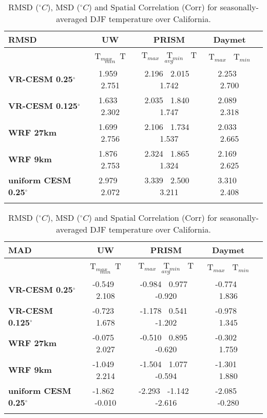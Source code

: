\documentclass[ms]{agutexSI}
\begin{document}
\begin{table}
\begin{center}
\caption{RMSD ($^\circ C$), MSD ($^\circ C$) and Spatial Correlation (Corr) for seasonally-averaged DJF temperature over California.} 
\begin{tabular}{lcccc}
\hline \textbf{RMSD} & \textbf{UW}  & \textbf{PRISM} & \textbf{Daymet} \\
\hline $    $ & T$_{max}$ $\     $  T$_{min}$ & T$_{max}$ $\     $  T$_{min}$ $\     $ T$_{avg}$& T$_{max}$ $\     $  T$_{min}$\\
\hline \textbf{VR-CESM 0.25$^\circ$} & 1.959 $\ $ 2.751 & 2.196 $\ $ 2.015 $\ $ 1.742 & 2.253 $\ $ 2.700 \\
\textbf{VR-CESM 0.125$^\circ$} & 1.633 $\ $ 2.302 & 2.035 $\ $ 1.840 $\ $ 1.747 & 2.089 $\ $ 2.318 \\
\textbf{WRF 27km} & 1.699 $\ $ 2.756 & 2.106 $\ $ 1.734 $\ $ 1.537 & 2.033 $\ $ 2.665 \\
\textbf{WRF 9km} & 1.876 $\ $ 2.753 & 2.324 $\ $ 1.865 $\ $ 1.324 & 2.169 $\ $ 2.625 \\
\textbf{uniform CESM 0.25$^\circ$} & 2.979 $\ $ 2.072 & 3.339 $\ $ 2.500 $\ $ 3.211 & 3.310 $\ $ 2.408 \\
\hline
\\
\end{tabular}

\begin{tabular}{lcccc}
\hline \textbf{MAD} & \textbf{UW}  & \textbf{PRISM} & \textbf{Daymet} \\
\hline $    $ & T$_{max}$ $\     $  T$_{min}$ & T$_{max}$ $\     $  T$_{min}$ $\     $ T$_{avg}$& T$_{max}$ $\     $  T$_{min}$\\
\hline \textbf{VR-CESM 0.25$^\circ$} & -0.549 $\ $ 2.108 & -0.984 $\ $ 0.977 $\ $ -0.920 & -0.774 $\ $ 1.836 \\
\textbf{VR-CESM 0.125$^\circ$} & -0.723 $\ $ 1.678 & -1.178 $\ $ 0.541 $\ $ -1.202 & -0.978 $\ $ 1.345 \\
\textbf{WRF 27km} & -0.075 $\ $ 2.027 & -0.510 $\ $ 0.895 $\ $ -0.620 & -0.302 $\ $ 1.759 \\
\textbf{WRF 9km} & -1.049 $\ $ 2.214 & -1.504 $\ $ 1.077 $\ $ -0.594 & -1.301 $\ $ 1.880 \\
\textbf{uniform CESM 0.25$^\circ$} & -1.862 $\ $ -0.010 & -2.293 $\ $ -1.142 $\ $ -2.616 & -2.085 $\ $ -0.280 \\
\hline
\\
\end{tabular}


\end{center}
\end{table}
\end{document}

